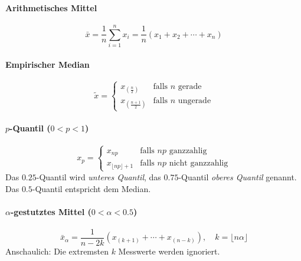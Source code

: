 \documentclass[a4paper, 11pt, accentcolor = tud3b]{tudreport}
\begin{document}
	                \paragraph{Arithmetisches Mittel}
	                \begin{equation*}
		                \bar{x} = \frac{1}{n} \sum_{i=1}^n x_i = \frac{1}{n} (x_1 + x_2 + \cdots + x_n)
	                \end{equation*}
	                
	                \paragraph{Empirischer Median}
	                \begin{equation*}
		                \tilde{x} =
		                \begin{cases}
		                	x_{(\frac{n}{2})}   & \textrm{falls } n \textrm{ gerade}   \\
		                	x_{(\frac{n+1}{2})} & \textrm{falls } n \textrm{ ungerade}
		                \end{cases}
	                \end{equation*}
	                
	                \paragraph{\(p\)-Quantil (\(0 < p < 1\))}
	                \begin{equation*}
		                x_p =
		                \begin{cases}
		                	x_{np}                     & \textrm{falls } np \textrm{ ganzzahlig}       \\
		                	x_{\lfloor np \rfloor + 1} & \textrm{falls } np \textrm{ nicht ganzzahlig}
		                \end{cases}
	                \end{equation*}
	                Das \(0.25\)-Quantil wird \textit{unteres Quantil}, das \(0.75\)-Quantil \textit{oberes Quantil} genannt. Das \(0.5\)-Quantil entspricht dem Median.
	                
	                \paragraph{\(\alpha\)-gestutztes Mittel (\(0 < \alpha < 0.5\))}
	                \begin{equation*}
		                \bar{x}_\alpha = \frac{1}{n - 2k} (x_{(k+1)} + \cdots + x_{(n-k)}), \quad k = \lfloor n\alpha \rfloor
	                \end{equation*}
	                Anschaulich: Die extremsten \(k\) Messwerte werden ignoriert.
\end{document}
